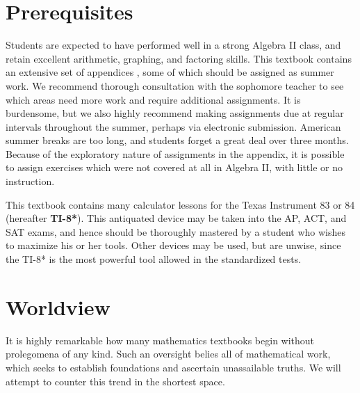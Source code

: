 \section{Prerequisites}
  
Students are expected to have performed well in a strong Algebra II class, and retain excellent
arithmetic, graphing, and factoring skills.  This textbook contains an extensive set of appendices 
, some of which should
be assigned as summer work.  We recommend thorough consultation with the sophomore teacher
to see which areas need more work and require additional assignments.  It is burdensome, but we
also highly recommend making assignments due at regular intervals throughout the summer, perhaps
via electronic submission.
American summer breaks are too long, and students forget a great
deal over three months.  Because of the exploratory nature of assignments in the appendix, it is
possible to assign exercises which were not covered at all in Algebra II, with little or no instruction.


This textbook contains many calculator lessons for the Texas Instrument 83 or 84 (hereafter \textbf{TI-8*}).
This antiquated device may be taken into the AP, ACT, and SAT exams, and hence 
should be thoroughly mastered by a student who wishes to maximize his or her tools.  Other
devices may be used, but are unwise, since the TI-8* is the most powerful tool allowed in the 
standardized tests.



\section{Worldview}
It is highly remarkable how many  mathematics textbooks begin without  
prolegomena of any kind.  Such an oversight belies all of mathematical work, which seeks 
to establish foundations and ascertain unassailable truths.  We will attempt to counter this trend
in the shortest space.


